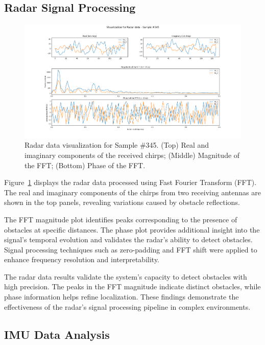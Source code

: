 \documentclass[12pt,a4paper]{article}
\begin{document}
\subsection{Radar Signal Processing}

\begin{figure}[h!]
    \centering
    \includegraphics[width=\textwidth]{Radar_sample_345.png}
    \caption{Radar data visualization for Sample \#345. (Top) Real and imaginary components of the received chirps; (Middle) Magnitude of the FFT; (Bottom) Phase of the FFT.}
    \label{fig:Radar}
\end{figure}

Figure~\ref{fig:Radar} displays the radar data processed using Fast Fourier Transform (FFT). The real and imaginary components of the chirps from two receiving antennas are shown in the top panels, revealing variations caused by obstacle reflections. 

The FFT magnitude plot identifies peaks corresponding to the presence of obstacles at specific distances. The phase plot provides additional insight into the signal's temporal evolution and validates the radar's ability to detect obstacles. Signal processing techniques such as zero-padding and FFT shift were applied to enhance frequency resolution and interpretability.

The radar data results validate the system's capacity to detect obstacles with high precision. The peaks in the FFT magnitude indicate distinct obstacles, while phase information helps refine localization. These findings demonstrate the effectiveness of the radar's signal processing pipeline in complex environments.

\subsection{IMU Data Analysis}
\end{document}
